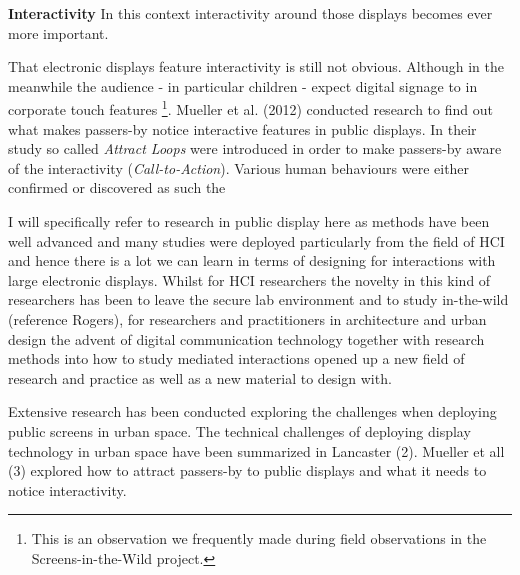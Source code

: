 \textbf{Interactivity}
In this context interactivity around those displays becomes ever more important. 




That electronic displays feature interactivity is still not obvious. Although in the meanwhile the audience - in particular children - expect digital signage to in corporate touch features \footnote{This is an observation we frequently made during field observations in the Screens-in-the-Wild project.}. 
Mueller et al. (2012) conducted research to find out what makes passers-by notice interactive features in public displays.
In their study so called \textit{Attract Loops} were introduced in order to make passers-by aware of the interactivity (\textit{Call-to-Action}). 
Various human behaviours were either confirmed or discovered as such the 


I will specifically refer to research in public display here as methods have been well advanced and many studies were deployed particularly from the field of HCI and hence there is a lot we can learn in terms of designing for interactions with large electronic displays. 
Whilst for HCI researchers the novelty in this kind of researchers has been to leave the secure lab environment and to study in-the-wild (reference Rogers), for researchers and practitioners in architecture and urban design the advent of digital communication technology together with research methods into how to study mediated interactions opened up a new field of research and practice as well as a new material to design with.   

Extensive research has been conducted exploring the challenges when deploying public screens in urban space. 
The technical challenges of deploying display technology in urban space have been summarized in Lancaster (2). 
Mueller et all (3) explored how to attract passers-by to public displays and what it needs to notice interactivity. 

